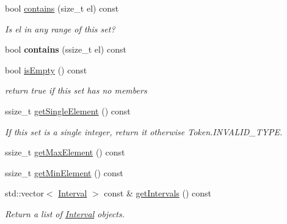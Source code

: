 \begin{DoxyCompactItemize}
\item 
\mbox{\label{classantlr4_1_1misc_1_1IntervalSet_ae45ff96376a2cd90fa0b72ea32decaf9}} 
bool \hyperlink{classantlr4_1_1misc_1_1IntervalSet_ae45ff96376a2cd90fa0b72ea32decaf9}{contains} (size\+\_\+t el) const
\begin{DoxyCompactList}\small\item\em Is el in any range of this set? \end{DoxyCompactList}\item 
\mbox{\label{classantlr4_1_1misc_1_1IntervalSet_afc6488f45c958dce6899759db3dae57d}} 
bool {\bfseries contains} (ssize\+\_\+t el) const
\item 
\mbox{\label{classantlr4_1_1misc_1_1IntervalSet_a8e95d772d8c02588ec690754e25d669f}} 
bool \hyperlink{classantlr4_1_1misc_1_1IntervalSet_a8e95d772d8c02588ec690754e25d669f}{is\+Empty} () const
\begin{DoxyCompactList}\small\item\em return true if this set has no members \end{DoxyCompactList}\item 
\mbox{\label{classantlr4_1_1misc_1_1IntervalSet_a9f90e3fc52eac6d52cb693d00c94e7f6}} 
ssize\+\_\+t \hyperlink{classantlr4_1_1misc_1_1IntervalSet_a9f90e3fc52eac6d52cb693d00c94e7f6}{get\+Single\+Element} () const
\begin{DoxyCompactList}\small\item\em If this set is a single integer, return it otherwise Token.\+I\+N\+V\+A\+L\+I\+D\+\_\+\+T\+Y\+PE. \end{DoxyCompactList}\item 
ssize\+\_\+t \hyperlink{classantlr4_1_1misc_1_1IntervalSet_a6f95bbd9eef0e87e637600c60ca65a6f}{get\+Max\+Element} () const
\item 
ssize\+\_\+t \hyperlink{classantlr4_1_1misc_1_1IntervalSet_ac56d5b4e2b0d420e15cfc33f2cbeec6e}{get\+Min\+Element} () const
\item 
std\+::vector$<$ \hyperlink{classantlr4_1_1misc_1_1Interval}{Interval} $>$ const  \& \hyperlink{classantlr4_1_1misc_1_1IntervalSet_ae0f5e60d4c0a59d259fed37e24ff96bc}{get\+Intervals} () const
\begin{DoxyCompactList}\small\item\em Return a list of \hyperlink{classantlr4_1_1misc_1_1Interval}{Interval} objects. \end{DoxyCompactList}\item 

\end{DoxyCompactItemize}
